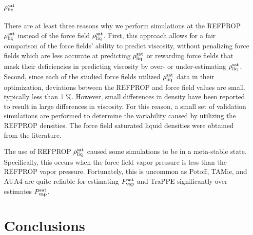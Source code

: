 \documentclass[preprint,review,12pt]{elsarticle}
\begin{document}
	\subsection{$\rho_{\rm liq}^{\rm sat}$}
	
	There are at least three reasons why we perform simulations at the REFPROP $\rho_{\rm liq}^{\rm sat}$ instead of the force field $\rho_{\rm liq}^{\rm sat}$. First, this approach allows for a fair comparison of the force fields' ability to predict viscosity, without penalizing force fields which are less accurate at predicting $\rho_{\rm liq}^{\rm sat}$ or rewarding force fields that mask their deficiencies in predicting viscosity by over- or under-estimating $\rho_{\rm liq}^{\rm sat}$. Second, since each of the studied force fields utilized $\rho_{\rm liq}^{\rm sat}$ data in their optimization, deviations between the REFPROP and force field values are small, typically less than 1 \%. However, small differences in density have been reported to result in large differences in viscosity. For this reason, a small set of validation simulations are performed to determine the variability caused by utilizing the REFPROP densities. The force field saturated liquid densities were obtained from the literature.      
	
	The use of REFPROP $\rho_{\rm liq}^{\rm sat}$ caused some simulations to be in a meta-stable state. Specifically, this occurs when the force field vapor pressure is less than the REFPROP vapor pressure. Fortunately, this is uncommon as Potoff, TAMie, and AUA4 are quite reliable for estimating $P_{\rm vap}^{\rm sat}$ and TraPPE significantly over-estimates $P_{\rm vap}^{\rm sat}$.
	
	\section{Conclusions} \label{Conclusions}
	
\end{document}
